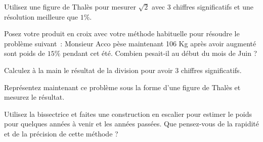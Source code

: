 Utilisez une figure de Thalès pour mesurer $\sqrt{2}$ avec 3 chiffres significatifs et une résolution meilleure que $1\%$.

Posez votre \og{} produit en croix\fg{} avec votre méthode habituelle pour résoudre le problème suivant~:
\og{} Monsieur Acco pèse maintenant 106 Kg après avoir augmenté sont poids  de $15\%$ pendant cet été. Combien pesait-il au début du mois de Juin ?\fg{}

Calculez à la main le résultat de la division pour avoir 3 chiffres significatifs.

Représentez maintenant ce problème sous la forme d'une figure de Thalès et mesurez le résultat.

Utilisez la bissectrice et faites une construction en escalier pour estimer le poids pour quelques années à venir et les années passées. Que pensez-vous de la rapidité et de la précision de cette méthode ?









